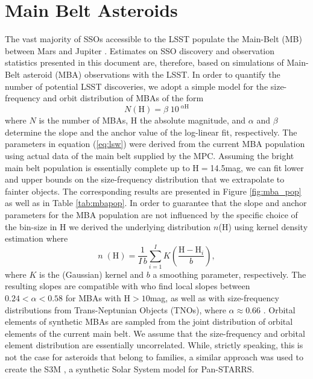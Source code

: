 \section{Main Belt Asteroids} \label{sec:mba}
The vast majority of SSOs accessible to the \gls{LSST} populate the Main-Belt (\gls{MB}) between Mars and Jupiter \citep{LSSTscibook2009}. Estimates on \gls{SSO} discovery and observation statistics presented in this document are, therefore, based on simulations of Main-Belt asteroid (\gls{MBA}) observations with the \gls{LSST}. 
In order to quantify the number of potential \gls{LSST} discoveries, we adopt a simple model for the size-frequency and orbit distribution of MBAs of the form
\begin{equation}
 N(\text{H})=\beta\;10^{\;\alpha \text{H}}
 \label{eq:lsw}
\end{equation}
where $N$ is the number of MBAs, H the absolute magnitude, and $\alpha$ and $\beta$ determine the slope and the anchor value of the log-linear fit, respectively.
The parameters in equation (\ref{eq:lsw}) were derived from the current \gls{MBA} population using actual data of the main belt supplied by the \gls{MPC}. 
Assuming the bright main belt population is essentially complete up to H$=$14.5mag, we can fit lower and upper bounds on the size-frequency distribution that we extrapolate to fainter objects. The corresponding results are presented in Figure \ref{fig:mba_pop} as well as in Table \ref{tab:mbapop}.
In order to guarantee that the slope and anchor parameters for the \gls{MBA} population are not influenced by the specific choice of the bin-size in H we derived the underlying distribution $n$(H) using kernel density estimation where
\begin{equation}
 n\;(\text{H})=\frac{1}{I\,b} \sum_{i=1}^{I} K\left(\frac{\text{H}-\text{H}_i}{b}\right),
 \label{eggl:eq:kernel}
\end{equation}
where $K$ is the (Gaussian) kernel and $b$ a smoothing parameter, respectively. The resulting slopes are compatible with \citet{jedicke2002} who find local slopes between $0.24<\alpha<0.58$ for MBAs with H$>10$mag, as well as with size-frequency distributions from Trans-Neptunian Objects (TNOs), where $\alpha\approx0.66$ \citep{bernstein2004}.
Orbital elements of synthetic MBAs are sampled from the joint distribution of orbital elements of the current main belt. We assume that the size-frequency and orbital element distribution are essentially uncorrelated. While, strictly speaking, this is not the case for asteroids that belong to families, a similar approach was used to create the S3M \citep{s3m}, a synthetic Solar System model for \gls{Pan-STARRS}.
